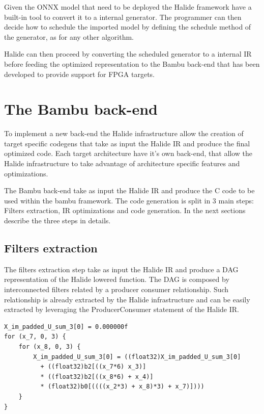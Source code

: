 \documentclass[../main.tex]{subfiles}
\begin{document}
Given the ONNX model that need to be deployed the Halide framework have a built-in tool to convert it to a internal generator. The programmer can then decide how to schedule the imported model by defining the schedule method of the generator, as for any other algorithm. 

Halide can then proceed by converting the scheduled generator to a internal IR before feeding the optimized representation to the Bambu back-end that has been developed to provide support for FPGA targets.


\section{The Bambu back-end}
\label {back-end}
To implement a new back-end the Halide infrastructure allow the creation of target specific codegens that take as input the Halide IR and produce the final optimized code. Each target architecture have it's own back-end, that allow the Halide infrastructure to take advantage of architecture specific features and optimizations.

The Bambu back-end take as input the Halide IR and produce the C code to be used within the bambu framework. The code generation is split in 3 main steps: Filters extraction, IR optimizations and code generation. In the next sections describe the three steps in details.

\subsection{Filters extraction}
The filters extraction step take as input the Halide IR and produce a DAG representation of the Halide lowered function. 
The DAG is composed by interconnected filters related by a producer consumer relationship. 
Such relationship is already extracted by the Halide infrastructure and can be easily extracted by leveraging the ProducerConsumer statement of the Halide IR.

\newpage
\begin{lstlisting}[caption= Example of filter extracted from the Halide IR. The extracted code is hard to translate to c language and access the memory buffers at each iteration. ]
X_im_padded_U_sum_3[0] = 0.000000f
for (x_7, 0, 3) {
    for (x_8, 0, 3) {
        X_im_padded_U_sum_3[0] = ((float32)X_im_padded_U_sum_3[0] 
          + ((float32)b2[((x_7*6) x_3)]
          * ((float32)b2[((x_8*6) + x_4)]
          * (float32)b0[((((x_2*3) + x_8)*3) + x_7)])))
    }
}
\end{lstlisting}
\end{document}
